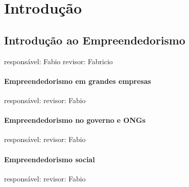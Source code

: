 \section{Introdução}

\subsection{Introdução ao Empreendedorismo}
responsável: Fabio revisor: Fabricio

\paragraph{Empreendedorismo em grandes empresas}
responsável: revisor: Fabio

\paragraph{Empreendedorismo no governo e ONGs}
responsável: revisor: Fabio

\paragraph{Empreendedorismo social}
responsável: revisor: Fabio
